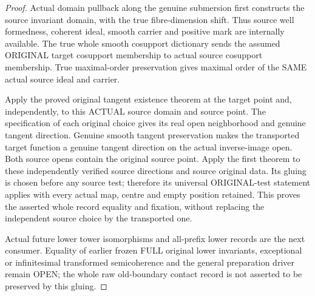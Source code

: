 \begin{proof}
Actual domain pullback along the genuine submersion first constructs the
source invariant domain, with the true fibre-dimension shift. Thus source
well formedness, coherent ideal, smooth carrier and positive mark are
internally available. The true whole smooth cosupport dictionary sends the
assumed ORIGINAL target cosupport membership to actual source cosupport
membership. True maximal-order preservation gives maximal order of the
SAME actual source ideal and carrier.

Apply the proved original tangent existence theorem at the target point
and, independently, to this ACTUAL source domain and source point. The
specification of each original choice gives its real open neighborhood and
genuine tangent direction. Genuine smooth tangent preservation makes the
transported target function a genuine tangent direction on the actual
inverse-image open. Both source opens contain the original source point.
Apply the first theorem to these independently verified source directions
and source original data. Its gluing is chosen before any source test;
therefore its universal ORIGINAL-test statement applies with every actual
map, centre and empty position retained. This proves the asserted whole
record equality and fixation, without replacing the independent source
choice by the transported one.

Actual future lower tower isomorphisms and all-prefix lower records are the
next consumer. Equality of earlier frozen FULL original lower invariants,
exceptional or infinitesimal transformed semicoherence and the general
preparation driver remain OPEN; the whole raw old-boundary contact record
is not asserted to be preserved by this gluing.
\end{proof}
